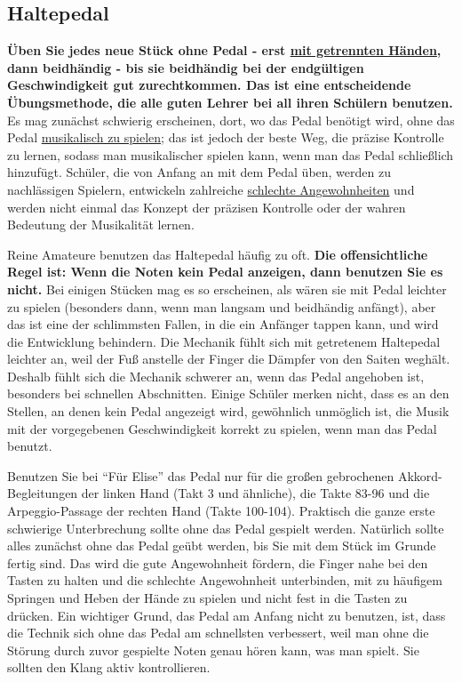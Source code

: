 
\subsection{Haltepedal}
\label{c1ii23}

\textbf{Üben Sie jedes neue Stück ohne Pedal - erst \hyperref[c1ii7]{mit getrennten Händen}, dann beidhändig - bis sie beidhändig bei der endgültigen Geschwindigkeit gut zurechtkommen.
Das ist eine entscheidende Übungsmethode, die alle guten Lehrer bei all ihren Schülern benutzen.}
Es mag zunächst schwierig erscheinen, dort, wo das Pedal benötigt wird, ohne das Pedal \hyperref[c1iii14d]{musikalisch zu spielen};
das ist jedoch der beste Weg, die präzise Kontrolle zu lernen, sodass man musikalischer spielen kann, wenn man das Pedal schließlich hinzufügt.
Schüler, die von Anfang an mit dem Pedal üben, werden zu nachlässigen Spielern, entwickeln zahlreiche \hyperref[c1ii22]{schlechte Angewohnheiten} und werden nicht einmal das Konzept der präzisen Kontrolle oder der wahren Bedeutung der Musikalität lernen.

Reine Amateure benutzen das Haltepedal häufig zu oft.
\textbf{Die offensichtliche Regel ist: Wenn die Noten kein Pedal anzeigen, dann benutzen Sie es nicht.}
Bei einigen Stücken mag es so erscheinen, als wären sie mit Pedal leichter zu spielen (besonders dann, wenn man langsam und beidhändig anfängt), aber das ist eine der schlimmsten Fallen, in die ein Anfänger tappen kann, und wird die Entwicklung behindern.
Die Mechanik fühlt sich mit getretenem Haltepedal leichter an, weil der Fuß anstelle der Finger die Dämpfer von den Saiten weghält.
Deshalb fühlt sich die Mechanik schwerer an, wenn das Pedal angehoben ist, besonders bei schnellen Abschnitten.
Einige Schüler merken nicht, dass es an den Stellen, an denen kein Pedal angezeigt wird, gewöhnlich unmöglich ist, die Musik mit der vorgegebenen Geschwindigkeit korrekt zu spielen, wenn man das Pedal benutzt.

Benutzen Sie bei \enquote{Für Elise} das Pedal nur für die großen gebrochenen Akkord-Begleitungen der linken Hand (Takt 3 und ähnliche), die Takte 83-96 und die Arpeggio-Passage der rechten Hand (Takte 100-104).
Praktisch die ganze erste schwierige Unterbrechung sollte ohne das Pedal gespielt werden.
Natürlich sollte alles zunächst ohne das Pedal geübt werden, bis Sie mit dem Stück im Grunde fertig sind.
Das wird die gute Angewohnheit fördern, die Finger nahe bei den Tasten zu halten und die schlechte Angewohnheit unterbinden, mit zu häufigem Springen und Heben der Hände zu spielen und nicht fest in die Tasten zu drücken.
Ein wichtiger Grund, das Pedal am Anfang nicht zu benutzen, ist, dass die Technik sich ohne das Pedal am schnellsten verbessert, weil man ohne die Störung durch zuvor gespielte Noten genau hören kann, was man spielt.
Sie sollten den Klang aktiv kontrollieren.

